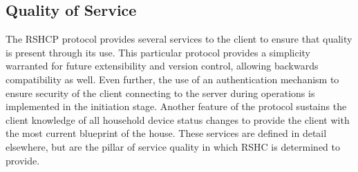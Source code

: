 \subsection{Quality of Service}
\label{sec:pdus:qos}

The RSHCP protocol provides several services to the client to ensure that quality is present through its use. This particular protocol provides a simplicity warranted for future extensibility and version control, allowing backwards compatibility as well. Even further, the use of an authentication mechanism to ensure security of the client connecting to the server during operations is implemented in the initiation stage. Another feature of the protocol sustains the client knowledge of all household device status changes to provide the client with the most current blueprint of the house. These services are defined in detail elsewhere, but are the pillar of service quality in which RSHC is determined to provide.
